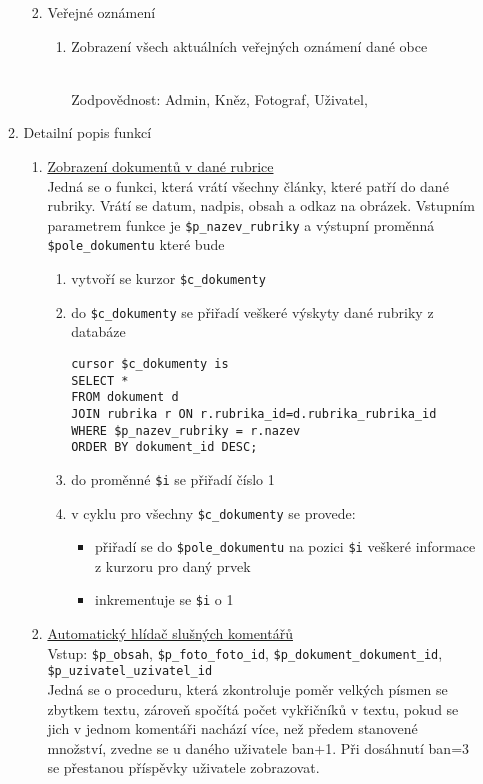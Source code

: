 \documentclass[12pt]{article}
\begin{document}
\begin{enumerate}
\begin{enumerate}[label*=\arabic*.]
\begin{enumerate}[label*=\arabic*.]
\begin{enumerate}[label*=\arabic*.]
				\end{enumerate}	
				\item Veřejné oznámení
				\begin{enumerate}[label*=\arabic*.]
					\item \hypertarget{verejne}{Zobrazení všech aktuálních veřejných oznámení dané obce}\\
					Zodpovědnost: Admin, Kněz, Fotograf, Uživatel, 
				\end{enumerate}
			\end{enumerate}
		\item Detailní popis funkcí
			\begin{enumerate}[label*=\arabic*.]
				\item \hyperlink{zobraz}{Zobrazení dokumentů v dané rubrice} \\
				Jedná se o funkci, která vrátí všechny články, které patří do dané rubriky. Vrátí se datum, nadpis, obsah a odkaz na obrázek.
				Vstupním parametrem funkce je \verb|$p_nazev_rubriky| a výstupní proměnná \verb|$pole_dokumentu| které bude 
				\begin{enumerate}[label=\arabic*.]
					\item vytvoří se kurzor \verb|$c_dokumenty|
					\item do \verb|$c_dokumenty| se přiřadí veškeré výskyty dané rubriky z databáze 
					\begin{lstlisting}
cursor $c_dokumenty is
SELECT *
FROM dokument d 
JOIN rubrika r ON r.rubrika_id=d.rubrika_rubrika_id
WHERE $p_nazev_rubriky = r.nazev 
ORDER BY dokument_id DESC;
					\end{lstlisting}
					\item do proměnné \verb|$i| se přiřadí číslo 1
					\item v cyklu pro všechny \verb|$c_dokumenty| se provede:
					\begin{itemize}
						\item přiřadí se do \verb|$pole_dokumentu| na pozici \verb|$i| veškeré informace z kurzoru pro daný prvek
						\item inkrementuje se \verb|$i| o 1
					\end{itemize}
				\end{enumerate}
			
				\item \hyperlink{dog}{Automatický hlídač slušných komentářů} \\
				Vstup: \verb|$p_obsah|, \verb|$p_foto_foto_id|,  \verb|$p_dokument_dokument_id|,  \verb|$p_uzivatel_uzivatel_id|\\
				Jedná se o proceduru, která zkontroluje poměr velkých písmen se zbytkem textu, zároveň spočítá počet vykřičníků v textu, pokud se jich v jednom komentáři nachází více, než předem stanovené množství, zvedne se u daného uživatele ban+1. Při dosáhnutí ban=3 se přestanou příspěvky uživatele zobrazovat.\\
				

\end{enumerate}
\end{enumerate}
\end{enumerate}
\end{document}
